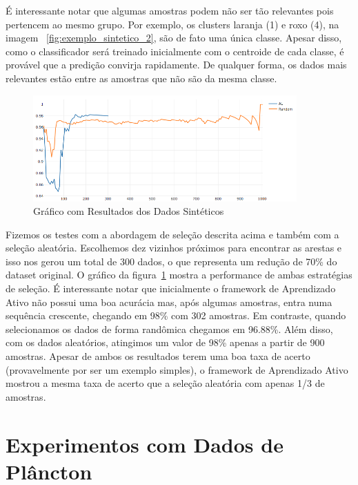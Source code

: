 É interessante notar que algumas amostras podem não ser tão relevantes pois pertencem ao mesmo grupo. Por exemplo, os clusters laranja (1) e roxo (4), na imagem ~\ref{fig:exemplo_sintetico_2}, são de fato uma única classe. Apesar disso, como o classificador será treinado inicialmente com o centroide de cada classe, é provável que a predição convirja rapidamente. De qualquer forma, os dados mais relevantes estão entre as amostras que não são da mesma classe. 


\begin{figure}
  \centering
  \includegraphics[width=0.9\textwidth]{figures/grafico_exemplo_sintetico.png}
  \caption{Gráfico com Resultados dos Dados Sintéticos}
  \label{fig:grafico_exemplo_sintetico}
\end{figure}

Fizemos os testes com a abordagem de seleção descrita acima e também com a seleção aleatória.  Escolhemos dez vizinhos próximos para encontrar as arestas e isso nos gerou um total de 300 dados, o que representa um redução de 70\% do dataset original. O gráfico da figura~\ref{fig:grafico_exemplo_sintetico} mostra a performance de ambas estratégias de seleção. É interessante notar que inicialmente o framework de Aprendizado Ativo não possui uma boa acurácia mas, após algumas amostras, entra numa sequência crescente, chegando em 98\% com 302 amostras. Em contraste, quando selecionamos os dados de forma randômica chegamos em 96.88\%. Além disso, com os dados aleatórios, atingimos um valor de 98\% apenas a partir de 900 amostras. Apesar de ambos os resultados terem uma boa taxa de acerto (provavelmente por ser um exemplo simples), o framework de Aprendizado Ativo mostrou a mesma taxa de acerto que a seleção aleatória com apenas 1/3 de amostras. 


\section{Experimentos com Dados de Plâncton}
\label{sec:experimentos_plancton}

